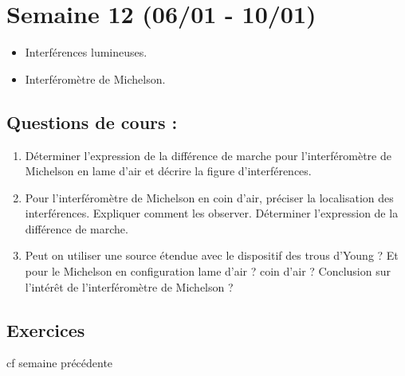 \section{Semaine 12 (06/01 - 10/01)}


\begin{itemize}
	\item Interférences lumineuses.
	\item Interféromètre de Michelson.
\end{itemize}

\subsection{Questions de cours :}
\begin{enumerate}
	\item Déterminer l'expression de la différence de marche pour l'interféromètre de Michelson en lame d'air et décrire la figure d'interférences.
	\item Pour l'interféromètre de Michelson en coin d'air, préciser la localisation des interférences. Expliquer comment les observer. Déterminer l'expression de la différence de marche.
	\item Peut on utiliser une source étendue avec le dispositif des trous d'Young ? Et pour le Michelson en configuration lame d'air ? coin d'air ? Conclusion sur l'intérêt de l'interféromètre de Michelson ?
\end{enumerate}

\subsection{Exercices}
cf semaine précédente